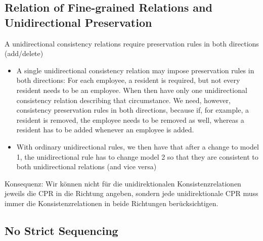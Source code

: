 


\subsection{Relation of Fine-grained Relations and Unidirectional Preservation}
A unidirectional consistency relations require preservation rules in both directions (add/delete)
\begin{itemize}
    \item A single unidirectional consistency relation may impose preservation rules in both directions: For each employee, a resident is required, but not every resident needs to be an employee. When then have only one unidirectional consistency relation describing that circumstance. We need, however, consistency preservation rules in both directions, because if, for example, a resident is removed, the employee needs to be removed as well, whereas a resident has to be added whenever an employee is added.
    \item With ordinary unidirectional rules, we then have that after a change to model 1, the unidirectional rule has to change model 2 so that they are consistent to both unidirectional relations (and vice versa)
\end{itemize}
Konsequenz: Wir können nicht für die unidirektionalen Konsistenzrelationen jeweils die CPR in die Richtung angeben, sondern jede unidirektionale CPR muss immer die Konsistenzrelationen in beide Richtungen berücksichtigen.


\subsection{No Strict Sequencing}

